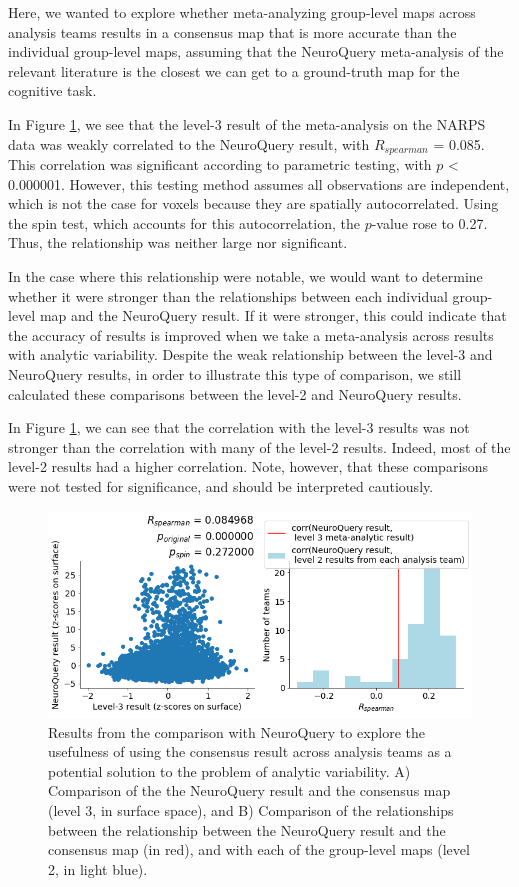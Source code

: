 \documentclass[a4paper,doc,natbib]{apa6}
\begin{document}
Here, we wanted to explore whether meta-analyzing group-level maps across analysis teams results in a consensus map that is more accurate than the individual group-level maps, assuming that the NeuroQuery meta-analysis of the relevant literature is the closest we can get to a ground-truth map for the cognitive task. 

In Figure \ref{fig:corr_NQ}, we see that the level-3 result of the meta-analysis on the NARPS data was weakly correlated to the NeuroQuery result, with $R_{spearman}$ = 0.085. This correlation was significant according to parametric testing, with $p$ < 0.000001. However, this testing method assumes all observations are independent, which is not the case for voxels because they are spatially autocorrelated. Using the spin test, which accounts for this autocorrelation, the $p$-value rose to 0.27. Thus, the relationship was neither large nor significant. 

In the case where this relationship were notable, we would want to determine whether it were stronger than the relationships between each individual group-level map and the NeuroQuery result. If it were stronger, this could indicate that the accuracy of results is improved when we take a meta-analysis across results with analytic variability. Despite the weak relationship between the level-3 and NeuroQuery results, in order to illustrate this type of comparison, we still calculated these comparisons between the level-2 and NeuroQuery results. 

In Figure \ref{fig:corr_NQ}, we can see that the correlation with the level-3 results was not stronger than the correlation with many of the level-2 results. Indeed, most of the level-2 results had a higher correlation. Note, however, that these comparisons were not tested for significance, and should be interpreted cautiously.

\begin{figure}[!htb]
	\includegraphics[width=\textwidth]
	{figures/results2B_hypo1_corr_with_NQ.png}
	\caption{\label{fig:corr_NQ} Results from the comparison with NeuroQuery to explore the usefulness of using the consensus result across analysis teams as a potential solution to the problem of analytic variability. A) Comparison of the the NeuroQuery result and the consensus map (level 3, in surface space), and B) Comparison of the relationships between the relationship between the NeuroQuery result and the consensus map (in red), and with each of the group-level maps (level 2, in light blue).}

\end{figure}
\end{document}
